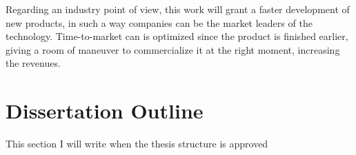  Regarding an industry point of view, this work will grant a faster development of new products, in such a way companies can be the market leaders of the technology. Time-to-market can is optimized since the product is finished earlier, giving a room of maneuver to commercialize it at the right moment, increasing the revenues.
 
\section{Dissertation Outline}

This section I will write when the thesis structure is approved

